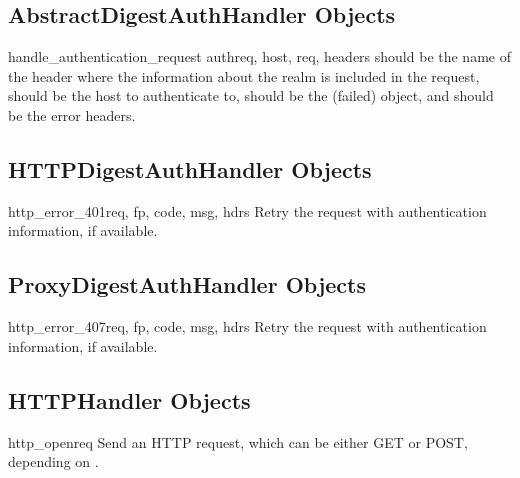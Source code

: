 \subsection{AbstractDigestAuthHandler Objects
            \label{abstract-digest-auth-handler}}

\begin{methoddesc}[AbstractDigestAuthHandler]{handle_authentication_request}
                                            {authreq, host, req, headers}
 should be the name of the header where the information about
the realm is included in the request,  should be the host to
authenticate to,  should be the (failed) 
object, and  should be the error headers.
\end{methoddesc}


\subsection{HTTPDigestAuthHandler Objects
            \label{http-digest-auth-handler}}

\begin{methoddesc}[HTTPDigestAuthHandler]{http_error_401}{req, fp, code, 
                                                        msg, hdrs}
Retry the request with authentication information, if available.
\end{methoddesc}


\subsection{ProxyDigestAuthHandler Objects
            \label{proxy-digest-auth-handler}}

\begin{methoddesc}[ProxyDigestAuthHandler]{http_error_407}{req, fp, code, 
                                                        msg, hdrs}
Retry the request with authentication information, if available.
\end{methoddesc}


\subsection{HTTPHandler Objects \label{http-handler-objects}}

\begin{methoddesc}[HTTPHandler]{http_open}{req}
Send an HTTP request, which can be either GET or POST, depending on
.
\end{methoddesc}


